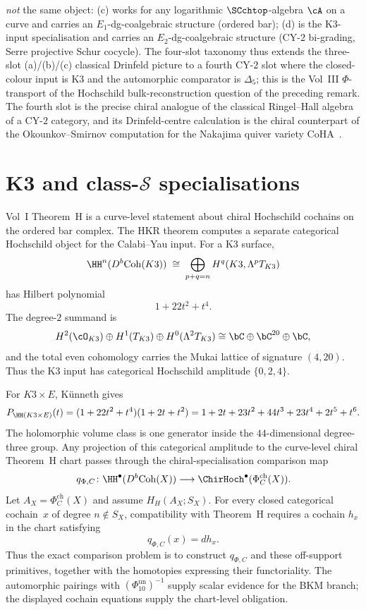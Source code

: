 \begin{remark}
\emph{not} the same object: (c) works for any logarithmic
$\SCchtop$-algebra $\cA$ on a curve and carries an
$E_1$-dg-coalgebraic structure (ordered bar); (d) is the K3-input
specialisation and carries an $E_2$-dg-coalgebraic structure
(CY-$2$ bi-grading, Serre projective Schur cocycle). The
four-slot taxonomy thus extends the three-slot (a)/(b)/(c) classical
Drinfeld picture to a fourth CY-$2$ slot where the closed-colour
input is K3 and the automorphic comparator is $\Delta_5$; this is the
Vol~III $\Phi$-transport of the Hochschild bulk-reconstruction
question of the preceding remark. The fourth slot is the precise
chiral analogue of the classical Ringel--Hall algebra of a CY-$2$
category, and its Drinfeld-centre calculation is the chiral
counterpart of the Okounkov--Smirnov computation for the
Nakajima quiver variety CoHA~\cite{OkounkovSmirnov16}.
\end{remark}

\section{K3 and class-\texorpdfstring{$\mathcal S$}{S} specialisations}
\label{sec:hoch-supplement}

\begin{remark}
\label{rem:hoch-1}
Vol~I Theorem~H is a curve-level statement about chiral Hochschild
cochains on the ordered bar complex. The HKR theorem computes a
separate categorical Hochschild object for the Calabi--Yau input. For
a K3 surface,
\[
\HH^n(D^b\mathrm{Coh}(K3))
\;\cong\;
\bigoplus_{p+q=n}H^q(K3,\Lambda^pT_{K3})
\]
has Hilbert polynomial
\[
 1+22t^2+t^4 .
\]
The degree-$2$ summand is
\[
H^2(\cO_{K3})\oplus H^1(T_{K3})\oplus H^0(\Lambda^2T_{K3})
\cong \bC\oplus\bC^{20}\oplus\bC,
\]
and the total even cohomology carries the Mukai lattice of signature
$(4,20)$. Thus the K3 input has categorical Hochschild amplitude
\(\{0,2,4\}\).

For \(K3\times E\), K\"unneth gives
\[
P_{\HH(K3\times E)}(t)
=
(1+22t^2+t^4)(1+2t+t^2)
=
1+2t+23t^2+44t^3+23t^4+2t^5+t^6 .
\]
The holomorphic volume class is one generator inside the
$44$-dimensional degree-three group. Any projection of this
categorical amplitude to the curve-level chiral Theorem~H chart passes through
the chiral-specialisation comparison map
\[
 q_{\Phi,C}\colon
 \HH^\bullet(D^b\mathrm{Coh}(X))
 \longrightarrow
 \ChirHoch^\bullet(\Phi^{\mathrm{ch}}_C(X)).
\]
Let $A_X=\Phi_C^{\mathrm{ch}}(X)$ and assume
$H_H(A_X;S_X)$. For every closed categorical cochain~$x$ of degree
$n\notin S_X$, compatibility with Theorem~H requires a cochain
$h_x$ in the chart satisfying
\[
 q_{\Phi,C}(x)=d h_x.
\]
Thus the exact comparison problem is to construct $q_{\Phi,C}$ and
these off-support primitives, together with the homotopies expressing
their functoriality. The automorphic pairings with
$(\Phi_{10}^{\mathrm{un}})^{-1}$ supply scalar evidence for the BKM
branch; the displayed cochain equations supply the chart-level
obligation.
\end{remark}

